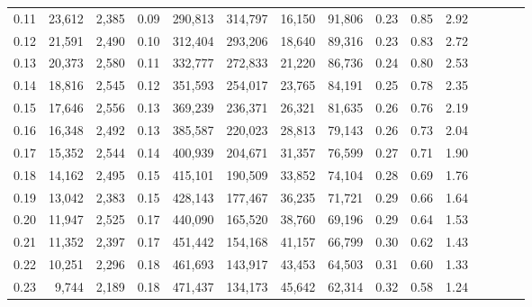 \begin{tabular}{rrrcrrrrrrrrrrr}
0.11 &  23,612 &  2,385 &                                       0.09 &  290,813 &  314,797 &   16,150 &   91,806 &  0.23 &  0.85 &                         2.92 \\
0.12 &  21,591 &  2,490 &                                       0.10 &  312,404 &  293,206 &   18,640 &   89,316 &  0.23 &  0.83 &                         2.72 \\
0.13 &  20,373 &  2,580 &                                       0.11 &  332,777 &  272,833 &   21,220 &   86,736 &  0.24 &  0.80 &                         2.53 \\
0.14 &  18,816 &  2,545 &                                       0.12 &  351,593 &  254,017 &   23,765 &   84,191 &  0.25 &  0.78 &                         2.35 \\
0.15 &  17,646 &  2,556 &                                       0.13 &  369,239 &  236,371 &   26,321 &   81,635 &  0.26 &  0.76 &                         2.19 \\
0.16 &  16,348 &  2,492 &                                       0.13 &  385,587 &  220,023 &   28,813 &   79,143 &  0.26 &  0.73 &                         2.04 \\
0.17 &  15,352 &  2,544 &                                       0.14 &  400,939 &  204,671 &   31,357 &   76,599 &  0.27 &  0.71 &                         1.90 \\
0.18 &  14,162 &  2,495 &                                       0.15 &  415,101 &  190,509 &   33,852 &   74,104 &  0.28 &  0.69 &                         1.76 \\
0.19 &  13,042 &  2,383 &                                       0.15 &  428,143 &  177,467 &   36,235 &   71,721 &  0.29 &  0.66 &                         1.64 \\
0.20 &  11,947 &  2,525 &                                       0.17 &  440,090 &  165,520 &   38,760 &   69,196 &  0.29 &  0.64 &                         1.53 \\
0.21 &  11,352 &  2,397 &                                       0.17 &  451,442 &  154,168 &   41,157 &   66,799 &  0.30 &  0.62 &                         1.43 \\
0.22 &  10,251 &  2,296 &                                       0.18 &  461,693 &  143,917 &   43,453 &   64,503 &  0.31 &  0.60 &                         1.33 \\
0.23 &   9,744 &  2,189 &                                       0.18 &  471,437 &  134,173 &   45,642 &   62,314 &  0.32 &  0.58 &                         1.24 \\

\end{tabular}

